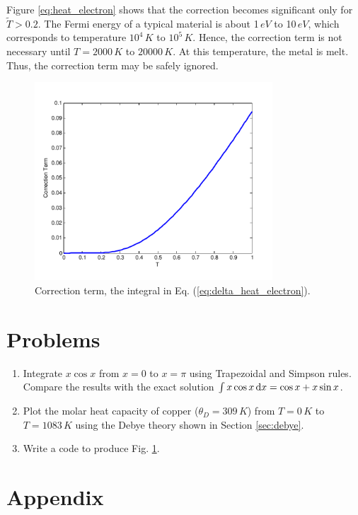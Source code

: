 Figure \ref{eq:heat_electron} shows that the correction becomes significant only for $\tilde{T}>0.2$.  The Fermi energy of a typical material is about 1$\, eV$ to 10$\, eV$, which corresponds to temperature $10^4\, K$ to $10^5\, K$. Hence, the correction term is not necessary until $T= 2000\, K$ to  $20000\, K$.  At this temperature, the metal is melt.  Thus, the correction term may be safely ignored.

\begin{figure}
\centerline{\includegraphics[width=3.5in]{03.integrals/c_electron.pdf}}
\caption{Correction term, the integral in Eq. (\ref{eq:delta_heat_electron}).}
\label{fig:heat_electron}
\end{figure}

\newpage
\noindent
\section*{Problems}

\begin{enumerate}[labelwidth=0.5cm,labelindent=0cm,leftmargin=*,label=\bfseries \thechapter.\arabic*,align=left]
%
\item Integrate $x \cos x$ from $x=0$ to $x=\pi$ using Trapezoidal and Simpson rules.  Compare the results with the exact solution $\int x \cos x\, \text{d} x = \cos x + x \sin x$.
%
\item Plot the molar heat capacity of copper ($\theta_D=309\, K$) from $T=0\, K$ to $T=1083\, K$ using the Debye theory shown in Section \ref{sec:debye}. 
%
\item Write a code to produce Fig. \ref{fig:heat_electron}.
\end{enumerate}

\newpage
\section*{Appendix}


